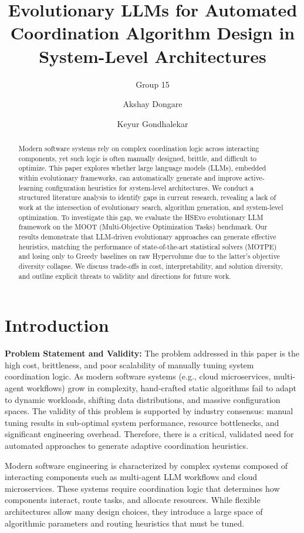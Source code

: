 \documentclass[sigconf,nonacm]{acmart}
\title{Evolutionary LLMs for Automated Coordination Algorithm Design in System-Level Architectures}
\subtitle{Group 15}
\author{Akshay Dongare}
\affiliation{
  \institution{North Carolina State University}
  \city{Raleigh}
  \state{NC}
  \country{USA}
}
\author{Keyur Gondhalekar}
\affiliation{
  \institution{North Carolina State University}
  \city{Raleigh}
  \state{NC}
  \country{USA}
}
\begin{document}
\begin{abstract}
Modern software systems rely on complex coordination logic across interacting components, yet such logic is often manually designed, brittle, and difficult to optimize. This paper explores whether large language models (LLMs), embedded within evolutionary frameworks, can automatically generate and improve active-learning configuration heuristics for system-level architectures. We conduct a structured literature analysis to identify gaps in current research, revealing a lack of work at the intersection of evolutionary search, algorithm generation, and system-level optimization. To investigate this gap, we evaluate the HSEvo evolutionary LLM framework on the MOOT (Multi-Objective Optimization Tasks) benchmark. Our results demonstrate that LLM-driven evolutionary approaches can generate effective heuristics, matching the performance of state-of-the-art statistical solvers (MOTPE) and losing only to Greedy baselines on raw Hypervolume due to the latter's objective diversity collapse. We discuss trade-offs in cost, interpretability, and solution diversity, and outline explicit threats to validity and directions for future work.
\end{abstract}

\maketitle

\section{Introduction}

\textbf{Problem Statement and Validity:} The problem addressed in this paper is the high cost, brittleness, and poor scalability of manually tuning system coordination logic. As modern software systems (e.g., cloud microservices, multi-agent workflows) grow in complexity, hand-crafted static algorithms fail to adapt to dynamic workloads, shifting data distributions, and massive configuration spaces. The validity of this problem is supported by industry consensus: manual tuning results in sub-optimal system performance, resource bottlenecks, and significant engineering overhead. Therefore, there is a critical, validated need for automated approaches to generate adaptive coordination heuristics.

Modern software engineering is characterized by complex systems composed of interacting components such as multi-agent LLM workflows and cloud microservices. These systems require coordination logic that determines how components interact, route tasks, and allocate resources. While flexible architectures allow many design choices, they introduce a large space of algorithmic parameters and routing heuristics that must be tuned.
\end{document}

